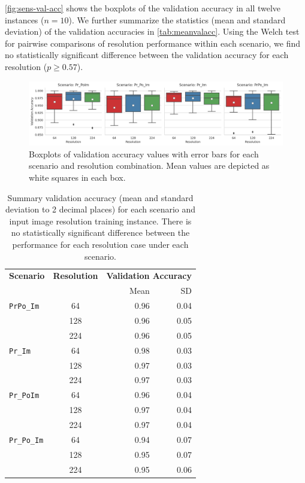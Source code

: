 \documentclass[Journal,letterpaper, SingleSpace, InsideFigs]{ascelike-new}
\begin{document}
\autoref{fig:sens-val-acc} shows the boxplots of the validation accuracy in all twelve instances ($n=10$).
We further summarize the statistics (mean and standard deviation) of the validation accuracies in \autoref{tab:meanvalacc}.
Using the Welch test for pairwise comparisons of resolution performance within each scenario, we find no statistically significant difference between the validation accuracy for each resolution ($p\ge 0.57$).
\begin{figure}[ht]
    \centering
    \includegraphics[width=\textwidth]{figures/scenario_resolution_validation_accuracy_boxplot.png}
    \caption{Boxplots of validation accuracy values with error bars for each scenario and resolution combination. Mean values are depicted as white squares in each box.}
    \label{fig:sens-val-acc}
\end{figure}
\begin{table}[h!]\small
    \centering
    \begin{tabular}{ l c r r}\toprule
\bf Scenario & \bf Resolution & \multicolumn{2}{c}{\bf Validation Accuracy}\\
& & Mean & SD \\\midrule
    \texttt{PrPo\_Im} & 64  & 0.96 & 0.04 \\
                      & 128 & 0.96 & 0.05 \\
                      &224  &      0.96&  0.05  \\ \midrule        
    \texttt{Pr\_Im}   & 64  & 0.98 & 0.03 \\
                      & 128 & 0.97 & 0.03 \\
                      & 224 & 0.97 & 0.03\\\midrule       
    \texttt{Pr\_PoIm} & 64  & 0.96 & 0.04 \\
                      & 128 & 0.97 & 0.04 \\
                      & 224 & 0.97 & 0.04 \\\midrule       
    \texttt{Pr\_Po\_Im}& 64  & 0.94 & 0.07 \\
                      & 128 & 0.95 & 0.07 \\
                      & 224 & 0.95 & 0.06 \\\bottomrule
    \end{tabular}
    \caption{Summary validation accuracy (mean and standard deviation to 2 decimal places) for each scenario and input image resolution training instance. There is no statistically significant difference between the performance for each resolution case under each scenario.}
    \label{tab:meanvalacc}
\end{table}
\end{document}
